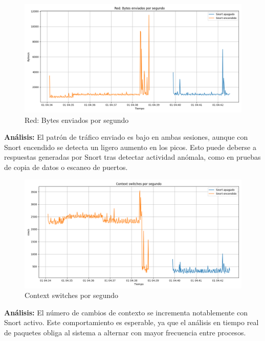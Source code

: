 \documentclass[12pt,a4paper]{report}
\begin{document}
\begin{figure}[H]
	\centering
	\includegraphics[width=\textwidth]{graficas/net_send.png}
	\caption{Red: Bytes enviados por segundo}
\end{figure}
\textbf{Análisis:} El patrón de tráfico enviado es bajo en ambas sesiones, aunque con Snort encendido se detecta un ligero aumento en los picos. Esto puede deberse a respuestas generadas por Snort tras detectar actividad anómala, como en pruebas de copia de datos o escaneo de puertos.

\begin{figure}[H]
	\centering
	\includegraphics[width=\textwidth]{graficas/context_switch.png}
	\caption{Context switches por segundo}
\end{figure}
\textbf{Análisis:} El número de cambios de contexto se incrementa notablemente con Snort activo. Este comportamiento es esperable, ya que el análisis en tiempo real de paquetes obliga al sistema a alternar con mayor frecuencia entre procesos.
\end{document}
